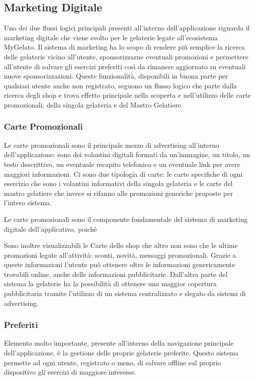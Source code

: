 \subsection{Marketing Digitale}
Uno dei due flussi logici principali presenti all'interno dell'applicazione riguarda il marketing digitale che viene svolto per le gelaterie legate all'ecosistema MyGelato.
Il sistema di marketing ha lo scopo di rendere più semplice la ricerca delle gelaterie vicino all'utente, sponsorizzarne eventuali promozioni e permettere all'utente di salvare gli esercizi preferiti così da rimanere aggiornato su eventuali nuove sponsorizzazioni.
Queste funzionalità, disponibili in buona parte per qualsiasi utente anche non registrato, seguono un flusso logico che parte dalla ricerca degli shop e trova effetto principale nella scoperta e nell'utilizzo delle carte promozionali, della singola gelateria e del Mastro Gelatiere.

\subsubsection{Carte Promozionali}
Le carte promozionali sono il principale mezzo di advertising all'interno dell'applicazione: sono dei volantini digitali formati da un'immagine, un titolo, un testo descrittivo, un eventuale recapito telefonico e un eventuale link per avere maggiori informazioni.
Ci sono due tipologia di carte: le carte specifiche di ogni esercizio che sono i volantini informativi della singola gelateria e le carte del mastro gelatiere che invece si rifanno alle promozioni generiche proposte per l'intero sistema.

Le carte promozionali sono il componente fondamentale del sistema di marketing digitale dell'applicativo, poichè 

Sono inoltre visualizzabili le Carte dello shop che altro non sono che le ultime promozioni legate all'attività: sconti, novità, messaggi promozionali.
Grazie a queste informazioni l'utente può ottenere oltre le informazioni genericamente trovabili online, anche delle informazioni pubblicitarie.
Dall'altra parte del sistema la gelaterie ha la possibilità di ottenere una maggior copertura pubblicitaria tramite l'utilizzo di un sistema centralizzato e slegato da sistemi di advertising.

\subsubsection{Preferiti}
Elemento molto importante, presente all'interno della navigazione principale dell'applicazione, è la gestione delle proprie gelaterie preferite.
Questo sistema permette ad ogni utente, registrato o meno, di salvare offline sul proprio dispositivo gli esercizi di maggiore interesse.

